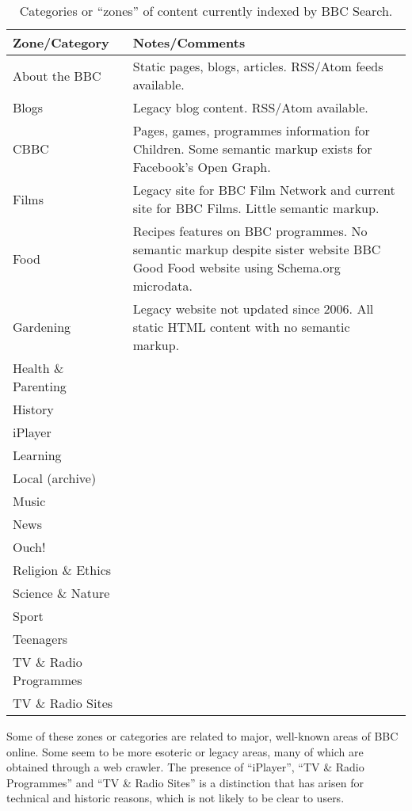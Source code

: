\begin{table}[h]
\begin{tabular}{| l | l |}
  Zone/Category          & Notes/Comments \\
  \hline
  About the BBC          &  Static pages, blogs, articles. RSS/Atom feeds available. \\
  Blogs                  &  Legacy blog content. RSS/Atom available. \\
  CBBC                   &  Pages, games, programmes information for Children. Some semantic markup exists for Facebook's Open Graph. \\
  Films                  &  Legacy site for BBC Film Network and current site for BBC Films. Little semantic markup. \\
  Food                   &  Recipes features on BBC programmes. No semantic markup despite sister website BBC Good Food website using Schema.org microdata. \\
  Gardening              &  Legacy website not updated since 2006. All static HTML content with no semantic markup. \\
  Health \& Parenting    &  \\
  History                &  \\
  iPlayer                &  \\
  Learning               &  \\
  Local (archive)        &  \\
  Music                  &  \\
  News                   &  \\
  Ouch!                  &  \\
  Religion \& Ethics     &  \\
  Science \& Nature      &  \\
  Sport                  &  \\
  Teenagers              &  \\
  TV \& Radio Programmes &  \\
  TV \& Radio Sites      &  \\
\end{tabular}
\caption{Categories or ``zones'' of content currently indexed by BBC Search.}
\label{zones-table}
\end{table}

Some of these zones or categories are related to major, well-known areas of
BBC online. Some seem to be more esoteric or legacy areas, many of which
are obtained through a web crawler. The presence of ``iPlayer'',
``TV \& Radio Programmes'' and ``TV \& Radio Sites'' is a distinction that
has arisen for technical and historic reasons, which is not likely to be
clear to users.

